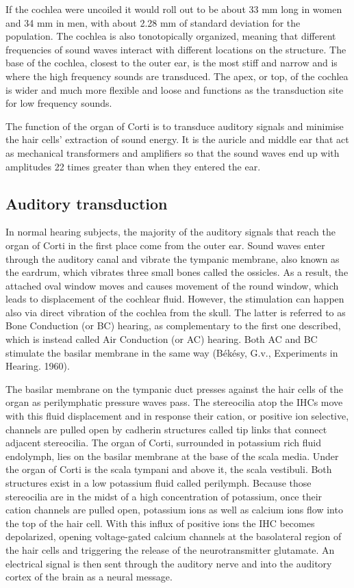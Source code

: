 If the cochlea were uncoiled it would roll out to be about 33 mm long in women and 34 mm in men, with about 2.28 mm of standard deviation for the population. The cochlea is also tonotopically organized, meaning that different frequencies of sound waves interact with different locations on the structure. The base of the cochlea, closest to the outer ear, is the most stiff and narrow and is where the high frequency sounds are transduced. The apex, or top, of the cochlea is wider and much more flexible and loose and functions as the transduction site for low frequency sounds.

The function of the organ of Corti is to transduce auditory signals and minimise the hair cells' extraction of sound energy. It is the auricle and middle ear that act as mechanical transformers and amplifiers so that the sound waves end up with amplitudes 22 times greater than when they entered the ear.

\hypertarget{auditory-transduction}{%
\subsection{Auditory transduction}\label{auditory-transduction}}

In normal hearing subjects, the majority of the auditory signals that reach the organ of Corti in the first place come from the outer ear. Sound waves enter through the auditory canal and vibrate the tympanic membrane, also known as the eardrum, which vibrates three small bones called the ossicles. As a result, the attached oval window moves and causes movement of the round window, which leads to displacement of the cochlear fluid. However, the stimulation can happen also via direct vibration of the cochlea from the skull. The latter is referred to as Bone Conduction (or BC) hearing, as complementary to the first one described, which is instead called Air Conduction (or AC) hearing. Both AC and BC stimulate the basilar membrane in the same way (Békésy, G.v., Experiments in Hearing. 1960).

The basilar membrane on the tympanic duct presses against the hair cells of the organ as perilymphatic pressure waves pass. The stereocilia atop the IHCs move with this fluid displacement and in response their cation, or positive ion selective, channels are pulled open by cadherin structures called tip links that connect adjacent stereocilia. The organ of Corti, surrounded in potassium rich fluid endolymph, lies on the basilar membrane at the base of the scala media. Under the organ of Corti is the scala tympani and above it, the scala vestibuli. Both structures exist in a low potassium fluid called perilymph. Because those stereocilia are in the midst of a high concentration of potassium, once their cation channels are pulled open, potassium ions as well as calcium ions flow into the top of the hair cell. With this influx of positive ions the IHC becomes depolarized, opening voltage-gated calcium channels at the basolateral region of the hair cells and triggering the release of the neurotransmitter glutamate. An electrical signal is then sent through the auditory nerve and into the auditory cortex of the brain as a neural message.

